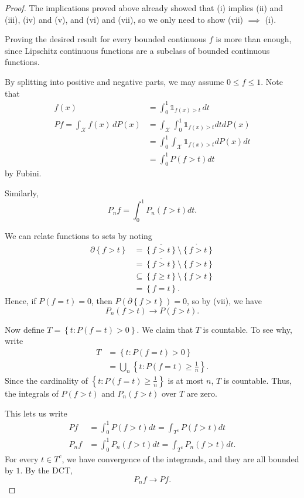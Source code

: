 \begin{proof}
	The implications proved above already showed that (i) implies (ii) and (iii), (iv) and (v), and (vi) and (vii), so we only need to show (vii) $\implies$ (i).
	
	Proving the desired result for every bounded continuous $f$ is more than enough, since Lipschitz continuous functions are a subclass of bounded continuous functions.

	By splitting into positive and negative parts, we may assume $0 \le f \le 1$. Note that
	\begin{align*}
		f(x) &= \int_{0}^{1} \mathds{1}_{f(x) > t}\,dt \\
		Pf = \int_{\mathscr{X}} f(x)\,dP(x) &= \int_{\mathscr{X}} \int_{0}^{1} \mathds{1}_{f(x) > t}dtdP(x) \\
		&= \int_{0}^{1} \int_{\mathscr{X}} \mathds{1}_{f(x) > t}dP(x)dt \\
		&= \int_{0}^{1} P(f > t) dt
	\end{align*} by Fubini.

	Similarly,
	\[
		P_n f = \int_{0}^{1} P_n(f > t)dt
	.\]

	We can relate functions to sets by noting \begin{align*}
		\partial \left\{f > t\right\} &= \overline{\left\{f > t\right\}} \setminus \mathring{\left\{f > t\right\}} \\
									  &= \overline{\left\{f > t\right\}} \setminus \left\{f > t\right\} \\
									  &\subseteq \left\{f \ge t\right\} \setminus \left\{f > t\right\} \\
									  &= \left\{f = t\right\}
									  .\end{align*} 
	Hence, if $P\left( f= t \right) = 0$, then $P \left( \partial \left\{f > t\right\} \right) = 0$, so by (vii), we have \[
		P_n (f > t) \to P(f > t)
	.\] 
	
	Now define $T = \left\{t : P(f= t) > 0\right\}$. We claim that $T$ is countable. To see why, write
	\begin{align*}
		T &= \left\{t: P(f=t) > 0\right\} \\
		&= \bigcup\limits_{n}^{} \left\{t : P(f= t) \ge  \frac{1}{n}\right\}
	.\end{align*}
	Since the cardinality of $\left\{t: P(f=t) \ge \frac{1}{n}\right\}$ is at most $n$, $T$ is countable. Thus, the integrals of $P(f>t)$ and $P_n(f>t)$ over $T$ are zero.

	This lets us write
	\begin{align*}
		Pf &= \int_{0}^{1} P (f> t ) dt = \int_{T^{c}}^{} P(f > t) dt   \\
		P_n f &= \int_{0}^{1} P_n (f >t) dt = \int_{T^{c}}^{} P_n(f > t) dt  
	.\end{align*}
	For every $t \in T^{c}$, we have convergence of the integrands, and they are all bounded by $1$. By the DCT, \[
		P_n f \to Pf
	.\] 
\end{proof}

